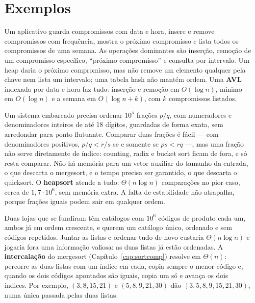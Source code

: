 \section{Exemplos}\label{sec:rvexemplos}
\begin{exemplo}
Um aplicativo guarda compromissos com data e hora, insere e remove compromissos com frequência, mostra o próximo compromisso e lista todos os compromissos de uma semana. As operações dominantes são inserção, remoção de um compromisso específico, ``próximo compromisso'' e consulta por intervalo. Um heap daria o próximo compromisso, mas não remove um elemento qualquer pela chave nem lista um intervalo; uma tabela hash não mantém ordem. Uma \textbf{AVL} indexada por data e hora faz tudo: inserção e remoção em $O(\log n)$, mínimo em $O(\log n)$ e a semana em $O(\log n+k)$, com $k$ compromissos listados.
\end{exemplo}
\begin{exemplo}
Um sistema embarcado precisa ordenar $10^5$ frações $p/q$, com numeradores e denominadores inteiros de até 18 dígitos, guardadas de forma exata, sem arredondar para ponto flutuante. Comparar duas frações é fácil --- com denominadores positivos, $p/q<r/s$ se e somente se $ps<rq$ ---, mas uma fração não serve diretamente de índice: counting, radix e bucket sort ficam de fora, e só resta comparar. Não há memória para um vetor auxiliar do tamanho da entrada, o que descarta o mergesort, e o tempo precisa ser garantido, o que descarta o quicksort. O \textbf{heapsort} atende a tudo: $\Theta(n\log n)$ comparações no pior caso, cerca de $1{,}7\cdot10^6$, sem memória extra. A falta de estabilidade não atrapalha, porque frações iguais podem sair em qualquer ordem.
\end{exemplo}
\begin{exemplo}\label{ex:catalogos}
Duas lojas que se fundiram têm catálogos com $10^6$ códigos de produto cada um, ambos já em ordem crescente, e querem um catálogo único, ordenado e sem códigos repetidos. Juntar as listas e ordenar tudo de novo custaria $\Theta(n\log n)$ e jogaria fora uma informação valiosa: as duas listas já estão ordenadas. A \textbf{intercalação} do mergesort (Capítulo~\ref{cap:sortcomp}) resolve em $\Theta(n)$: percorre as duas listas com um índice em cada, copia sempre o menor código e, quando os dois códigos apontados são iguais, copia um só e avança os dois índices. Por exemplo, $(3,8,15,21)$ e $(5,8,9,21,30)$ dão $(3,5,8,9,15,21,30)$, numa única passada pelas duas listas.
\end{exemplo}

